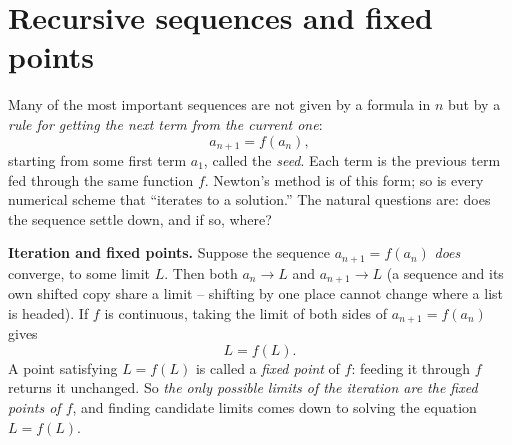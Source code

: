 \section{Recursive sequences and fixed points}
\label{ch28:recursion}

Many of the most important sequences are not given by a formula in $n$ but by a
\emph{rule for getting the next term from the current one}:
\[
  a_{n+1} = f(a_n),
\]
starting from some first term $a_1$, called the \emph{seed}. Each term is the previous term fed through the
same function $f$. Newton's method is of this form; so is every numerical scheme
that ``iterates to a solution.'' The natural questions are: does the sequence
settle down, and if so, where?

\begin{happeningbox}
\textbf{Iteration and fixed points.} Suppose the
sequence $a_{n+1} = f(a_n)$ \emph{does} converge, to some limit $L$. Then both
$a_n \to L$ and $a_{n+1} \to L$ (a sequence and its own shifted copy share a
limit -- shifting by one place cannot change where a list is headed). If $f$ is
continuous, taking the limit of both sides of $a_{n+1} = f(a_n)$ gives
\[
  L = f(L).
\]
A point satisfying $L = f(L)$ is called a \emph{fixed point} of $f$: feeding it
through $f$ returns it unchanged. So \emph{the only possible limits of the
iteration are the fixed points of $f$}, and finding candidate limits comes down
to solving the equation $L = f(L)$.
\end{happeningbox}


